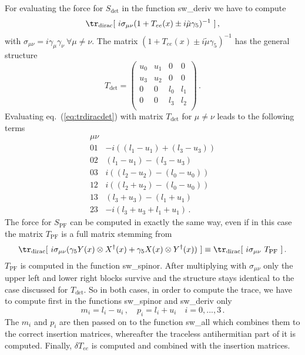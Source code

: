 For evaluating the force for $S_\mathrm{det}$ in the function
{\ttfamily sw\_deriv} we have to compute
\begin{equation}
  \label{eq:trdiracdet}
  \tr_\mathrm{dirac}[\ i\sigma_{\mu\nu}(1+T_{ee}(x)\pm
  i\tilde\mu\gamma_5)^{-1}\ ]\, ,
\end{equation}
with $\sigma_{\mu\nu} = i\gamma_\mu\gamma_\nu\ \forall \mu\neq\nu$.
The matrix $(1+T_{ee}(x)\pm i\tilde\mu\gamma_5)^{-1}$ has the general
structure
\[
T_\mathrm{det} = 
\begin{pmatrix}
  u_0 & u_1 & 0 & 0 \\
  u_3 & u_2 & 0 & 0 \\
  0 & 0 & l_0 & l_1 \\
  0 & 0 & l_3 & l_2 \\
\end{pmatrix}\,.
\]
Evaluating eq.~(\ref{eq:trdiracdet}) with matrix $T_\mathrm{det}$ for
$\mu\neq\nu$ leads to the following terms
\begin{eqnarray*}
  \label{eq:trsigma}
  \mu\nu & \\
  01 & -i (( l_1 -u_1) + (l_3-u_3))\\
  02 & (l_1 - u_1) - (l_3 - u_3)\\
  03 & i((l_2-u_2) - (l_0-u_0))\\
  12 & i((l_2+u_2) - (l_0-u_0))\\
  13 & (l_3+u_3) - (l_1 + u_1)\\
  23 & -i(l_3+u_3+l_1+u_1)\,.
\end{eqnarray*}
The force for $S_\mathrm{PF}$ can be computed in exactly the same way,
even if in this case the matrix $T_\mathrm{PF}$ is a full matrix
stemming from 
\begin{equation}
  \label{eq:trdiracpf}
  \tr_\mathrm{dirac}[\ i\sigma_{\mu\nu}(\gamma_5Y(x)\otimes
  X^\dagger(x) + \gamma_5X(x)\otimes Y^\dagger(x))\ ]\equiv
  \tr_\mathrm{dirac}[\ i\sigma_{\mu\nu}\ T_\mathrm{PF}\ ]\, .
\end{equation}
$T_\mathrm{PF}$ is computed in the function {\ttfamily sw\_spinor}.
After multiplying with 
$\sigma_{\mu\nu}$ only the upper left and lower right blocks survive
and the structure stays identical to the case discussed for
$T_\mathrm{det}$. So in both cases, in order to compute the trace, we
have to compute first in the functions {\ttfamily sw\_spinor} and
{\ttfamily sw\_deriv} only
\begin{equation}
  m_i = l_i - u_i\,,\quad p_i = l_i + u_i\quad i = 0,...,3\,.
\end{equation}
The $m_i$ and $p_i$ are then passed on to the function {\ttfamily
  sw\_all} which combines them to the correct insertion matrices,
whereafter the traceless antihermitian part of it is
computed. Finally, $\delta T_{ee}$ is computed and combined with the
insertion matrices.

